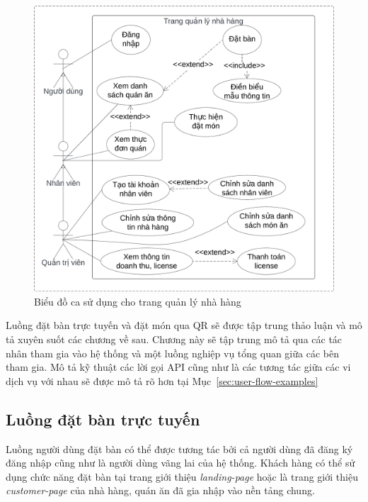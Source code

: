 \begin{figure}[H]
	\centering
	\includegraphics[width=\textwidth]{images/hChip/main-flow/admin-page-use-case-diagram.png}
	\caption{Biểu đồ ca sử dụng cho trang quản lý nhà hàng }
	\label{fig:admin-page-use-case}
\end{figure}

Luồng đặt bàn trực tuyến và đặt món qua QR sẽ được tập trung thảo luận và mô tả xuyên suốt các chương về sau.
Chương này sẽ tập trung mô tả qua các tác nhân tham gia vào hệ thống và một luồng nghiệp vụ tổng quan giữa các bên tham gia.
Mô tả kỹ thuật các lời gọi API cũng như là các tương tác giữa các vi dịch vụ với nhau sẽ được mô tả rõ hơn tại Mục~\autoref{sec:user-flow-examples}

\subsection{Luồng đặt bàn trực tuyến}\label{sec:reservation-flow}
Luồng người dùng đặt bàn có thể được tương tác bởi cả người dùng đã đăng ký đăng nhập cũng như là người dùng vãng lai của hệ thống.
Khách hàng có thể sử dụng chức năng đặt bàn tại trang giới thiệu \textit{landing-page} hoặc là trang giới thiệu \textit{customer-page} của nhà hàng, quán ăn đã gia nhập vào nền tảng chung.

